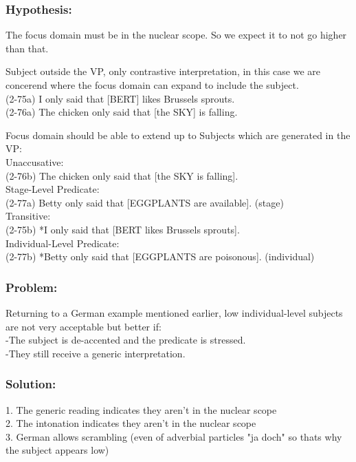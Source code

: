 \documentclass[landscape]{article}
\begin{document}
\begin{itemize}
\subsubsection*{Hypothesis: }

The focus domain must be in the nuclear scope. So we expect it to not go higher than that.

\begin{example} Subject outside the VP, only contrastive interpretation, in this case we are concerend where the focus domain can expand to include the subject.\\
(2-75a) I only said that [BERT] likes Brussels sprouts.\\
(2-76a) The chicken only said that [the SKY] is falling.\\
\end{example}

\begin{example}Focus domain should be able to extend up to Subjects which are generated in the VP:\\
Unaccusative:\\
(2-76b) The chicken only said that [the SKY is falling].\\
Stage-Level Predicate:\\
(2-77a) Betty only said that [EGGPLANTS are available]. (stage)\\
Transitive:\\
(2-75b) *I only said that [BERT likes Brussels sprouts].\\
Individual-Level Predicate:\\
(2-77b) *Betty only said that [EGGPLANTS are poisonous]. (individual)\\
\end{example}

\subsubsection*{Problem:}
Returning to a German example mentioned earlier, low individual-level subjects are not very acceptable but better if:\\
-The subject is de-accented and the predicate is stressed. \\
-They still receive a generic interpretation. \\
\subsubsection*{Solution:}
1. The generic reading indicates they aren't in the nuclear scope\\
2. The intonation indicates they aren't in the nuclear scope\\
3. German allows scrambling (even of adverbial particles "ja doch" so thats why the subject appears low)


\end{itemize}
\end{document}
